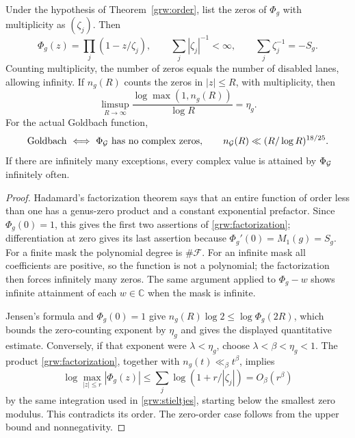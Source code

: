 \begin{corollary}\label{grw:zeros}
Under the hypothesis of Theorem~\ref{grw:order}, list the zeros
of $\Phi_g$ with multiplicity as $(\zeta_j)$.  Then
\begin{equation}
 \Phi_g(z)=\prod_j(1-z/\zeta_j),\qquad
 \sum_j|\zeta_j|^{-1}<\infty,\qquad
 \sum_j\zeta_j^{-1}=-S_g.
 \label{grw:factorization}
\end{equation}
Counting multiplicity, the number of zeros equals the number of
disabled lanes, allowing infinity.
If $n_g(R)$ counts the zeros in $|z|\le R$, with multiplicity, then
\begin{equation}
 \limsup_{R\to\infty}
 \frac{\log\max(1,n_g(R))}{\log R}=\eta_g.
 \label{grw:zero-exponent}
\end{equation}
For the actual Goldbach function,
\[
 \GC\ \Longleftrightarrow\ \Phi_{\Gold}\text{ has no complex zeros},
 \qquad n_{\Gold}(R)\ll(R/\log R)^{18/25}.
\]
If there are infinitely many exceptions, every complex value is
attained by $\Phi_{\mathcal G}$ infinitely often.
\end{corollary}
\begin{proof}
Hadamard's factorization theorem \cite{sampHadamard1893} says that
an entire function of order less than one has a genus-zero product
and a constant exponential prefactor.  Since $\Phi_g(0)=1$, this
gives the first two assertions of \eqref{grw:factorization};
differentiation at zero gives its last assertion because
$\Phi_g'(0)=M_1(g)=S_g$.  For a finite mask the polynomial degree
is $\#\mathcal F$.  For an infinite mask all coefficients are
positive, so the function is not a polynomial; the factorization
then forces infinitely many zeros.  The same argument applied to
$\Phi_g-w$ shows infinite attainment of each $w\in\mathbb C$
when the mask is infinite.

Jensen's formula and $\Phi_g(0)=1$ give
$n_g(R)\log2\le\log\Phi_g(2R)$, which bounds the zero-counting
exponent by $\eta_g$ and gives the displayed quantitative estimate.
Conversely, if that exponent were $\lambda<\eta_g$, choose
$\lambda<\beta<\eta_g<1$.  The product
\eqref{grw:factorization}, together with
$n_g(t)\ll_\beta t^\beta$, implies
\[
 \log\max_{|z|\le r}|\Phi_g(z)|
 \le\sum_j\log(1+r/|\zeta_j|)=O_\beta(r^\beta)
\]
by the same integration used in \eqref{grw:stieltjes}, starting
below the smallest zero modulus.  This contradicts its order.
The zero-order case follows from the upper bound and nonnegativity.
\end{proof}

